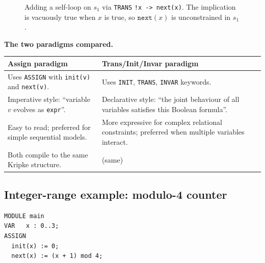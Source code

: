 \begin{figure}[ht]
  \centering
  \caption{Adding a self-loop on $s_1$ via \texttt{TRANS} \texttt{!x ->
           next(x)}.  The implication is vacuously true when $x$ is true,
           so $\texttt{next}(x)$ is unconstrained in $s_1$.}
  \label{fig:flipflop-selfloop}
\end{figure}

\medskip\noindent
\textbf{The two paradigms compared.}
\begin{center}
  \renewcommand{\arraystretch}{1.3}
  \begin{tabular}{p{5cm} p{7cm}}
    \toprule
    \textbf{Assign paradigm} & \textbf{Trans/Init/Invar paradigm} \\
    \midrule
    Uses \texttt{ASSIGN} with \texttt{init(v)} and \texttt{next(v)}. &
    Uses \texttt{INIT}, \texttt{TRANS}, \texttt{INVAR} keywords. \\
    Imperative style: ``variable $v$ evolves as \texttt{expr}''. &
    Declarative style: ``the joint behaviour of all variables satisfies
    this Boolean formula''. \\
    Easy to read; preferred for simple sequential models. &
    More expressive for complex relational constraints; preferred when
    multiple variables interact. \\
    Both compile to the same Kripke structure. & (same) \\
    \bottomrule
  \end{tabular}
\end{center}

\subsection{Integer-range example: modulo-4 counter}
\label{sec:smv-mod4}

\begin{verbatim}
MODULE main
VAR   x : 0..3;
ASSIGN
  init(x) := 0;
  next(x) := (x + 1) mod 4;
\end{verbatim}

